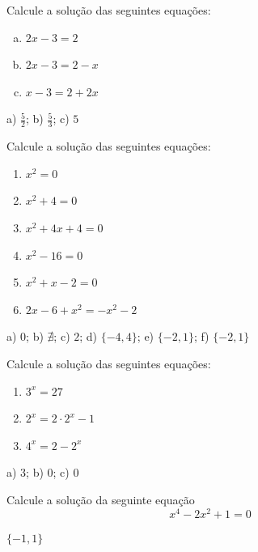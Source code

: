 \begin{exer}
  Calcule a solução das seguintes equações:
  \begin{enumerate}[a)]
  \item $2x - 3 = 2$
  \item $2x - 3 = 2 - x$
  \item $x - 3 = 2 + 2x$
  \end{enumerate}
\end{exer}
\begin{resp}
  a) $\frac{5}{2}$; b) $\frac{5}{3}$; c) $5$
\end{resp}

\begin{exer}
  Calcule a solução das seguintes equações:
  \begin{enumerate}
  \item $x^2 = 0$
  \item $x^2 + 4 = 0$
  \item $x^2 + 4x + 4 = 0$
  \item $x^2 - 16 = 0$
  \item $x^2 + x - 2 = 0$
  \item $2x - 6 + x^2 = -x^2 - 2$
  \end{enumerate}
\end{exer}
\begin{resp}
  a) $0$; b) $\nexists$; c) $2$; d) $\{-4,4\}$; e) $\{-2,1\}$; f) $\{-2,1\}$ 
\end{resp}

\begin{exer}
  Calcule a solução das seguintes equações:
  \begin{enumerate}
  \item $3^x = 27$
  \item $2^x = 2\cdot 2^x - 1$
  \item $4^x = 2 - 2^x$
  \end{enumerate}
\end{exer}
\begin{resp}
 a) $3$; b) $0$; c) $0$
\end{resp}

\begin{exer}
  Calcule a solução da seguinte equação
  \begin{equation}
    x^4 - 2x^2 + 1 = 0
  \end{equation}
\end{exer}
\begin{resp}
  $\{-1,1\}$
\end{resp}

